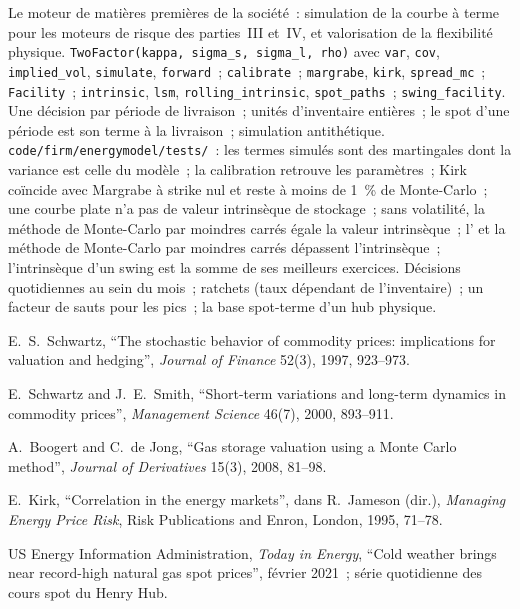 \begin{build}
 Le moteur de matières premières de la société~: simulation de la courbe à terme pour les moteurs
de risque des parties~III et~IV,  et valorisation de la
flexibilité physique.
 \texttt{TwoFactor(kappa, sigma\_s, sigma\_l, rho)} avec \texttt{var},
\texttt{cov}, \texttt{implied\_vol}, \texttt{simulate}, \texttt{forward}~;
\texttt{calibrate}~; \texttt{margrabe}, \texttt{kirk}, \texttt{spread\_mc}~;
\texttt{Facility}~; \texttt{intrinsic}, \texttt{lsm}, \texttt{rolling\_intrinsic},
\texttt{spot\_paths}~; \texttt{swing\_facility}.
 Une décision par période de livraison~; unités d'inventaire entières~; le spot d'une période
est son terme à la livraison~; simulation antithétique.
 \texttt{code/firm/energymodel/tests/}~: les termes simulés sont des
martingales dont la variance est celle du modèle~; la calibration retrouve les paramètres~; Kirk coïncide avec
Margrabe à strike nul et reste à moins de 1~\% de Monte-Carlo~; une courbe plate n'a pas de
valeur intrinsèque de stockage~; sans volatilité, la méthode de Monte-Carlo par moindres carrés égale la valeur intrinsèque~; l'
et la méthode de Monte-Carlo par moindres carrés dépassent l'intrinsèque~; l'intrinsèque d'un swing est la somme de
ses meilleurs exercices.
 Décisions quotidiennes au sein du mois~; ratchets (taux dépendant de
l'inventaire)~; un facteur de sauts pour les pics~; la base spot-terme d'un hub physique.
\end{build}

\begin{omsources}
\item E.\ S.\ Schwartz, ``The stochastic behavior of commodity prices: implications for
valuation and hedging'', \emph{Journal of Finance} 52(3), 1997, 923--973.
\item E.\ Schwartz and J.\ E.\ Smith, ``Short-term variations and long-term dynamics in
commodity prices'', \emph{Management Science} 46(7), 2000, 893--911.
\item A.\ Boogert and C.\ de Jong, ``Gas storage valuation using a Monte Carlo method'',
\emph{Journal of Derivatives} 15(3), 2008, 81--98.
\item E.\ Kirk, ``Correlation in the energy markets'', dans R.\ Jameson (dir.), \emph{Managing Energy Price
Risk}, Risk Publications and Enron, London, 1995, 71--78.
\item US Energy Information Administration, \emph{Today in Energy}, ``Cold weather brings
near record-high natural gas spot prices'', février 2021~; série quotidienne des cours spot du Henry Hub.
\end{omsources}

